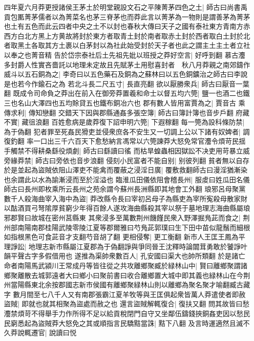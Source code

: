 四年夏六月莽更授諸侯王茅土於明堂親設文石之平陳菁茅四色之土|{
	師古曰尚書禹貢包匭菁茅儒者以為菁菜名也茅三脊茅也而莽此言以菁茅為一物則是謂善茅為菁茅也土有五色而此云四者中央之土不以封也春秋大傳曰天子之國有泰社東方青南方赤西方白北方黑上方黄故將封於東方者取青土封於南者取赤土封於西者取白土封於北者取黑土各取其方土裹以白茅封以為社此始受封於天子者也此之謂主土主土者立社以奉之也菁音精}
告於岱宗泰社后土先祖先妣以班授之莽好空言|{
	好呼到翻}
慕古灋多封爵人性實吝嗇託以地理未定故且先賦茅土用慰喜封者　秋八月莽親之南郊鑄作威斗以五石銅為之|{
	李奇曰以五色藥石及銅為之蘇林曰以五色銅鑛治之師古曰李說是也若今作鍮石之為}
若北斗長二尺五寸|{
	長直亮翻}
欲以厭勝衆兵|{
	師古曰厭音一葉翻}
既成令司命負之莽出在前入在御旁莽置羲和命士以督五均六筦|{
	鹽一也酒二也鐵三也名山大澤四也五均賖貸五也鐵布銅冶六也}
郡有數人皆用富賈為之|{
	賈音古}
乘傳求利|{
	傳知戀翻}
交錯天下因與郡縣通姦多張空簿|{
	師古曰簿計簿也音步戶翻}
府藏不實|{
	藏徂浪翻}
百姓愈病是歲莽復下詔申明六筦|{
	下遐稼翻}
每一筦為設科條防禁|{
	為于偽翻}
犯者罪至死姦民猾吏並侵衆庶各不安生又一切調上公以下諸有奴婢者|{
	調復釣翻}
率一口出三千六百天下愈愁納言馮常以六筦諫莽大怒免常官灋令煩苛民揺手觸禁不得耕桑繇役煩劇|{
	師古曰繇讀曰徭}
而枯旱蝗蟲相因獄訟不决吏用苛暴立威旁緣莽禁|{
	師古曰旁依也音步浪翻}
侵刻小民富者不能自别|{
	别彼列翻}
貧者無以自存於是並起為盜賊依阻山澤吏不能禽而覆蔽之浸淫日廣|{
	覆敷救翻師古曰漫淫猶漸染也余謂此以水為諭漸浸而至於淫溢也}
臨淮瓜田儀依阻會稽長州|{
	服䖍曰姓瓜田名儀師古曰長州即枚乘所云長州之苑余謂今蘇州長洲縣即其地會工外翻}
琅邪呂母聚黨數千人殺海曲宰入海中為盜|{
	莽改縣令長曰宰初呂母子為縣吏為宰所寃殺母散家財以酤酒買弓弩隂厚貧窮少年得百餘人遂攻海曲縣殺其宰以祭于墓地理志海曲縣屬琅邪郡賢曰故城在密州莒縣東}
其衆浸多至萬數荆州饑饉民衆入野澤掘鳬茈而食之|{
	荆州部南陽南郡桂陽武陵零陵江夏等郡爾雅曰芍鳬茈郭璞曰生下田中苗似龍鬚而細根如指根黑色可食茈音才支翻芍音胡了翻}
更相侵奪|{
	更工衡翻}
新市人王匡王鳳為平理諍訟|{
	地理志新市縣屬江夏郡為于偽翻諍與爭同晉王沈釋時論闒茸勇敢於饕諍叶韻平聲古字多假借用也}
遂推為渠帥衆數百人|{
	孔安國曰渠大也帥所類翻}
於是諸亡命者南陽馬武潁川王常成丹等皆往從之共攻離鄉聚臧於緑林山中|{
	賢曰離鄉聚謂諸鄉聚離散去城郭遠者大曰鄉小曰聚前書曰收合離鄉置大城中即其義也緑林山在今荆州當陽縣東北余按郡國志新市侯國有離鄉聚緑林山則以離鄉為聚名聚才喻翻臧古藏字}
數月間至七八千人又有南郡張霸江夏羊牧等與王匡俱起衆皆萬人莽遣使者即赦盜賊|{
	即就也就其相聚為盜處而赦之也}
還言盜賊解輒復合|{
	復扶又翻}
問其故皆曰愁灋禁煩苛不得舉手力作所得不足以給貢稅閉門自守又坐鄰伍鑄錢挾銅姦吏因以愁民民窮悉起為盜賊莽大怒免之其或順指言民驕黠當誅|{
	黠下八翻}
及言時運適然且滅不久莽說輒遷官|{
	說讀曰悦}


